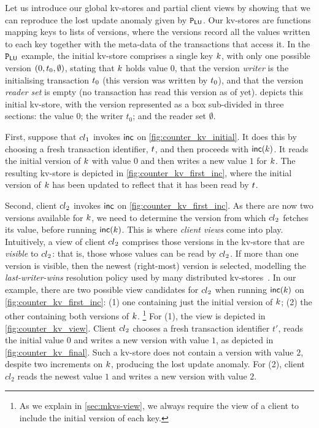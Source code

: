 Let us introduce  our global kv-stores and partial client views by
showing that we can reproduce the lost update anomaly given by 
$\mathtt{P}_{\mathsf{LU}}$.
Our kv-stores are functions mapping keys to lists of versions, where
the versions  record all the values written to each key together with the
meta-data of the transactions that access it. 
In the $\mathtt{P}_{\mathsf{LU}}$ example, the initial kv-store comprises a single key $k$, with only one possible 
version $(0, t_{0}, \emptyset)$,  stating that $k$ holds value $0$, 
that the version \emph{writer} is the initialising transaction
$t_0$ (this version was written by $t_0$), 
and that the version \emph{reader set} is empty (no transaction has read this version as of yet). 
 depicts this initial kv-store, with the version
represented as a box sub-divided in three sections: the value $0$;
the writer $t_0$; and the reader set $\emptyset$. 







First, suppose that ${cl}_1$  invokes $\mathsf{inc}$ on
\cref{fig:counter_kv_initial}. It does this by choosing a fresh
transaction identifier, $t$, 
and then proceeds with $\mathsf{inc}(k)$. It reads the initial version
of $k$ with value $0$ 
and then writes a new value $1$ for $k$. 
The resulting kv-store is depicted in \cref{fig:counter_kv_first_inc},
where  the initial version of $k$  has been  updated to reflect that it
has been read by $t$. 

Second, client ${cl}_2$ invokes $\mathsf{inc}$ on
\cref{fig:counter_kv_first_inc}.  As there are now two versions
available for $k$, we need to determine the version from which
${cl}_2$ fetches its value, before running $\mathsf{inc}(k)$.  This is
where \emph{client views} come into play.  Intuitively, a view of
client ${cl}_2$ comprises those versions in the kv-store that are
\emph{visible} to ${cl}_2$: that is, those whose values can be read by
${cl}_2$.  If more than one version is visible, then the newest
(right-most) version is selected, modelling the \emph{last-writer-wins}
resolution policy used by many distributed
kv-stores~\cite{vogels:2009:ec:1435417.1435432}.  In our example,
there are two possible view candidates for ${cl}_2$ when running
$\mathsf{inc}(k)$ on \cref{fig:counter_kv_first_inc}: (1) one containing
just the initial version of $k$; (2) the other containing both
versions of $k$.%
\footnote{ As we explain in \cref{sec:mkvs-view}, we always require
  the view of a client to include the initial version of each key.}  
For (1), the view is depicted in
\cref{fig:counter_kv_view}.  Client ${cl}_2$ chooses a fresh
transaction identifier $t'$, reads the initial value $0$ and writes a
new version with value $1$, as depicted in
\cref{fig:counter_kv_final}.  Such a kv-store does not contain a
version with value $2$, despite two increments on $k$, producing
the lost update anomaly.  For (2), client $cl_2$ reads the newest
value $1$ and writes a new version with value $2$.

